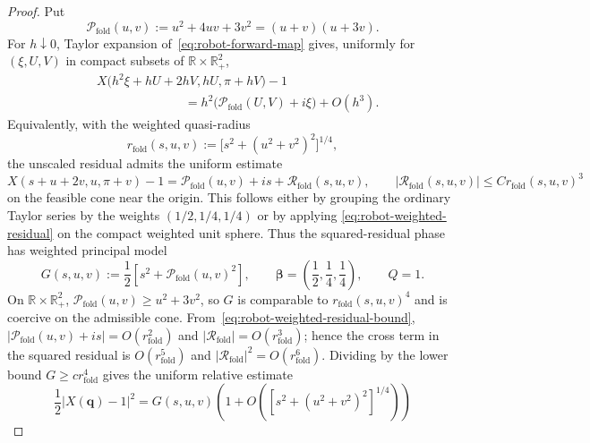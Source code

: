 \documentclass[10pt,a4paper]{amsart}
\newcommand{\R}{\mathbb{R}}
\begin{document}
\begin{proof}
Put
\begin{equation}\label{eq:robot-corner-quadratic}
 \mathcal P_{\mathrm{fold}}(u,v):=u^2+4uv+3v^2=(u+v)(u+3v).
\end{equation}
For $h\downarrow0$, Taylor expansion of~\eqref{eq:robot-forward-map} gives,
uniformly for $(\xi,U,V)$ in compact subsets of
$\R\times\R_+^2$,
\begin{equation}\label{eq:robot-weighted-residual}
 \begin{split}
 &X\bigl(h^2\xi+hU+2hV,hU,\pi+hV\bigr)-1\\
 &\hspace{7em}
 =h^2\bigl(\mathcal P_{\mathrm{fold}}(U,V)+i\xi\bigr)+O(h^3).
 \end{split}
\end{equation}
Equivalently, with the weighted quasi-radius
\[
 r_{\mathrm{fold}}(s,u,v):=\bigl[s^2+(u^2+v^2)^2\bigr]^{1/4},
\]
the unscaled residual admits the uniform estimate
\begin{equation}\label{eq:robot-weighted-residual-bound}
 X(s+u+2v,u,\pi+v)-1=\mathcal P_{\mathrm{fold}}(u,v)+is+\mathcal R_{\mathrm{fold}}(s,u,v),
 \qquad |\mathcal R_{\mathrm{fold}}(s,u,v)|\le C r_{\mathrm{fold}}(s,u,v)^3
\end{equation}
on the feasible cone near the origin.  This follows either by grouping the
ordinary Taylor series by the weights $(1/2,1/4,1/4)$ or by applying
\eqref{eq:robot-weighted-residual} on the compact weighted unit sphere.
Thus the squared-residual phase has weighted principal model
\begin{equation}\label{eq:robot-principal-model}
 G(s,u,v):=\frac12\left[s^2+\mathcal P_{\mathrm{fold}}(u,v)^2\right],
 \qquad
 \bm\beta=\left(\frac12,\frac14,\frac14\right),
 \qquad Q=1.
\end{equation}
On $\R\times\R_+^2$,
$\mathcal P_{\mathrm{fold}}(u,v)\ge u^2+3v^2$, so $G$ is comparable to $r_{\mathrm{fold}}(s,u,v)^4$ and is coercive
on the admissible cone.  From~\eqref{eq:robot-weighted-residual-bound},
$|\mathcal P_{\mathrm{fold}}(u,v)+is|=O(r_{\mathrm{fold}}^2)$ and $|\mathcal R_{\mathrm{fold}}|=O(r_{\mathrm{fold}}^3)$; hence the cross term in the squared
residual is $O(r_{\mathrm{fold}}^5)$ and $|\mathcal R_{\mathrm{fold}}|^2=O(r_{\mathrm{fold}}^6)$.  Dividing by the lower bound
$G\ge cr_{\mathrm{fold}}^4$ gives the uniform relative estimate
\begin{equation}\label{eq:robot-phase-relative-error}
 \frac12|X(\bm q)-1|^2
 =G(s,u,v)\left(1+O\left(
 [s^2+(u^2+v^2)^2]^{1/4}
 \right)\right)
\end{equation}

\end{proof}
\end{document}
